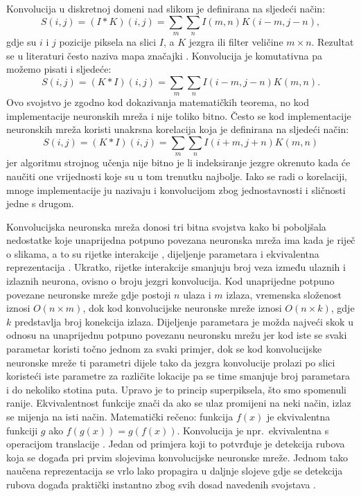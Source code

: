 \documentclass[times, utf8, diplomski]{fer}
\begin{document}
Konvolucija u diskretnoj domeni nad slikom je definirana na sljedeći način:
\begin{equation}
    S(i,j) = (I \ast K)(i,j) = \sum_{m}\sum_{n}I(m,n)K(i-m,j-n),
\end{equation}
gdje su $i$ i $j$ pozicije piksela na slici $I$, a $K$ jezgra  ili filter veličine $m \times n$. Rezultat se u literaturi često naziva mapa značajki . Konvolucija je komutativna  pa možemo pisati i sljedeće:
\begin{equation}
    S(i,j) = (K \ast I)(i,j) = \sum_{m}\sum_{n}I(i-m,j-n)K(m,n).
\end{equation}
Ovo svojstvo je zgodno kod dokazivanja matematičkih teorema, no kod implementacije neuronskih mreža i nije toliko bitno. Često se kod implementacije neuronskih mreža koristi unakrsna korelacija  koja je definirana na sljedeći način:
\begin{equation}
    S(i,j) = (K \ast I)(i,j) = \sum_{m}\sum_{n}I(i+m,j+n)K(m,n)
\end{equation}
jer algoritmu strojnog učenja nije bitno je li indeksiranje jezgre okrenuto kada će naučiti one vrijednosti koje su u tom trenutku najbolje. Iako se radi o korelaciji, mnoge implementacije ju nazivaju i konvolucijom zbog jednostavnosti i sličnosti jedne s drugom.

Konvolucijska neuronska mreža donosi tri bitna svojstva kako bi poboljšala nedostatke koje unaprijedna potpuno povezana neuronska mreža ima kada je riječ o slikama, a to su rijetke interakcije , dijeljenje parametara  i ekvivalentna reprezentacija . Ukratko, rijetke interakcije smanjuju broj veza između ulaznih i izlaznih neurona, ovisno o broju jezgri konvolucija. Kod unaprijedne potpuno povezane neuronske mreže gdje postoji $n$ ulaza i $m$ izlaza, vremenska složenost iznosi $O(n \times m)$, dok kod konvolucijske neuronske mreže iznosi $O(n \times k)$, gdje $k$ predstavlja broj konekcija izlaza. Dijeljenje parametara je možda najveći skok u odnosu na unaprijednu potpuno povezanu neuronsku mrežu jer kod iste se svaki parametar koristi točno jednom za svaki primjer, dok se kod konvolucijske neuronske mreže ti parametri dijele tako da jezgra konvolucije prolazi po slici koristeći iste parametre za različite lokacije pa se time smanjuje broj parametara i do nekoliko stotina puta. Upravo je to princip superpiksela, što smo spomenuli ranije. Ekvivalentnost funkcije znači da ako se ulaz promijeni na neki način, izlaz se mijenja na isti način. Matematički rečeno: funkcija $f(x)$ je ekvivalentna funkciji $g$ ako $f(g(x)) = g(f(x))$. Konvolucija je npr.\ ekvivalentna s operacijom translacije . Jedan od primjera koji to potvrđuje je detekcija rubova koja se događa pri prvim slojevima konvolucijske neuronske mreže. Jednom tako naučena reprezentacija se vrlo lako propagira u daljnje slojeve gdje se detekcija rubova događa praktički instantno zbog svih dosad navedenih svojstava \citep{Goodfellow-et-al-2016}.
\end{document}

